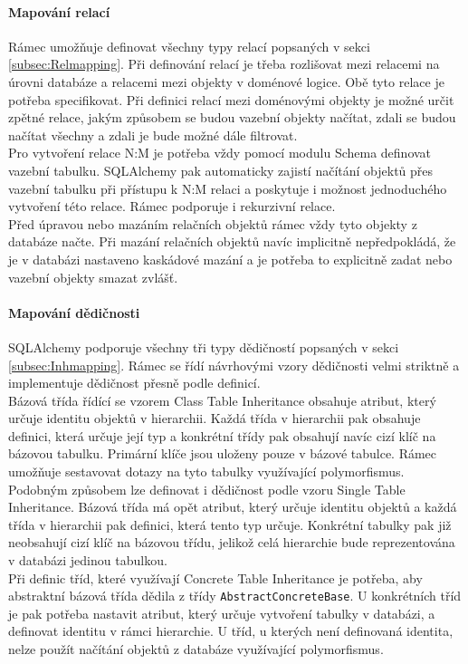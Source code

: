 \documentclass[ing,male,java,dept456]{diploma}						%
\begin{document}
\paragraph{Mapování relací}

Rámec umožňuje definovat všechny typy relací popsaných v sekci \ref{subsec:Relmapping}. Při definování relací je třeba rozlišovat mezi relacemi na úrovni databáze a relacemi mezi objekty v doménové logice. Obě tyto relace je potřeba specifikovat. Při definici relací mezi doménovými objekty je možné určit zpětné relace, jakým způsobem se budou vazební objekty načítat, zdali se budou načítat všechny a zdali je bude možné dále filtrovat. \\
Pro vytvoření relace N:M je potřeba vždy pomocí modulu Schema definovat vazební tabulku. SQLAlchemy pak automaticky zajistí načítání objektů přes vazební tabulku při přístupu k N:M relaci a poskytuje i možnost jednoduchého vytvoření této relace. Rámec podporuje i rekurzivní relace. \\
Před úpravou nebo mazáním relačních objektů rámec vždy tyto objekty z databáze načte. Při mazání relačních objektů navíc implicitně nepředpokládá, že je v databázi nastaveno kaskádové mazání a je potřeba to explicitně zadat nebo vazební objekty smazat zvlášť.

\paragraph{Mapování dědičnosti}

SQLAlchemy podporuje všechny tři typy dědičností popsaných v sekci \ref{subsec:Inhmapping}. Rámec se řídí návrhovými vzory dědičnosti velmi striktně a implementuje dědičnost přesně podle definicí. \\
Bázová třída řídící se vzorem Class Table Inheritance obsahuje atribut, který určuje identitu objektů v hierarchii. Každá třída v hierarchii pak obsahuje definici, která určuje její typ a konkrétní třídy pak obsahují navíc cizí klíč na bázovou tabulku. Primární klíče jsou uloženy pouze v bázové tabulce. Rámec umožňuje sestavovat dotazy na tyto tabulky využívající polymorfismus. \\
Podobným způsobem lze definovat i dědičnost podle vzoru Single Table Inheritance. Bázová třída má opět atribut, který určuje identitu objektů a každá třída v hierarchii pak definici, která tento typ určuje. Konkrétní tabulky pak již neobsahují cizí klíč na bázovou třídu, jelikož celá hierarchie bude reprezentována v databázi jedinou tabulkou. \\
Při definic tříd, které využívají Concrete Table Inheritance je potřeba, aby abstraktní bázová třída dědila z třídy \lstinline[style=inlinepython]|AbstractConcreteBase|. U konkrétních tříd je pak potřeba nastavit atribut, který určuje vytvoření tabulky v databázi, a definovat identitu v rámci hierarchie. U tříd, u kterých není definovaná identita, nelze použít načítání objektů z databáze využívající polymorfismus.
\end{document}
